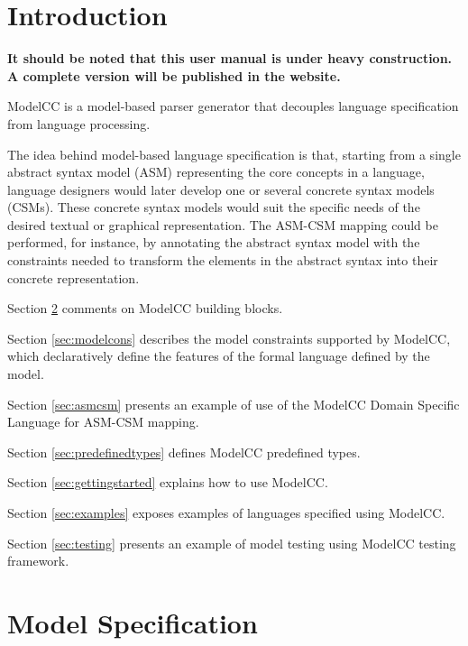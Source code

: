 \documentclass[a4paper,twoside,onecolumn]{article}
\newcommand{\pb}{\newpage}
\newcommand{\empt}{\pb \thispagestyle{empty} \rule[0mm]{0mm}{0mm} \pb}
\begin{document}


\pagestyle{empty}

\tableofcontents

\cleardoublepage

\pagestyle{fancy}

\newpage
\section{Introduction} 

{\bf \color{red} It should be noted that this user manual is under heavy construction. A complete version will be published in the website.}

ModelCC is a model-based parser generator that decouples language specification from language processing.

The idea behind model-based language specification is that, starting from a single abstract syntax model (ASM) representing the core concepts in
a language, language designers would later develop one or several concrete syntax models (CSMs). These concrete syntax models would suit the
specific needs of the desired textual or graphical representation. The ASM-CSM mapping could be performed, for instance, by annotating the
abstract syntax model with the constraints needed to transform the elements in the abstract syntax into their concrete representation.


Section \ref{sec:modelspec} comments on ModelCC building blocks.

Section \ref{sec:modelcons} describes the model constraints supported by ModelCC, which declaratively define the features of the formal language defined by the model.

Section \ref{sec:asmcsm} presents an example of use of the ModelCC Domain Specific Language for ASM-CSM mapping.

Section \ref{sec:predefinedtypes} defines ModelCC predefined types.

Section \ref{sec:gettingstarted} explains how to use ModelCC.

Section \ref{sec:examples} exposes examples of languages specified using ModelCC.

Section \ref{sec:testing} presents an example of model testing using ModelCC testing framework.

\section{Model Specification} \label{sec:modelspec}
\end{document}
